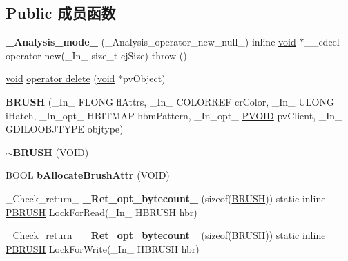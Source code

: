 \subsection*{Public 成员函数}
\begin{DoxyCompactItemize}
\item 
\mbox{\label{class_b_r_u_s_h_a4fdc57802164b268d120cd978dafd4b0}} 
{\bfseries \+\_\+\+Analysis\+\_\+mode\+\_\+} (\+\_\+\+Analysis\+\_\+operator\+\_\+new\+\_\+null\+\_\+) inline \hyperlink{interfacevoid}{void} $\ast$\+\_\+\+\_\+cdecl operator new(\+\_\+\+In\+\_\+ size\+\_\+t cj\+Size)  throw ()
\item 
\hyperlink{interfacevoid}{void} \hyperlink{class_b_r_u_s_h_a457266c039301ff0c938f1fee80544c1}{operator delete} (\hyperlink{interfacevoid}{void} $\ast$pv\+Object)
\item 
\mbox{\label{class_b_r_u_s_h_a52f0609ca54e8364f115e0d3fe4e4fb2}} 
{\bfseries B\+R\+U\+SH} (\+\_\+\+In\+\_\+ F\+L\+O\+NG fl\+Attrs, \+\_\+\+In\+\_\+ C\+O\+L\+O\+R\+R\+EF cr\+Color, \+\_\+\+In\+\_\+ U\+L\+O\+NG i\+Hatch, \+\_\+\+In\+\_\+opt\+\_\+ H\+B\+I\+T\+M\+AP hbm\+Pattern, \+\_\+\+In\+\_\+opt\+\_\+ \hyperlink{interfacevoid}{P\+V\+O\+ID} pv\+Client, \+\_\+\+In\+\_\+ G\+D\+I\+L\+O\+O\+B\+J\+T\+Y\+PE objtype)
\item 
\mbox{\label{class_b_r_u_s_h_aff34836a6b76089ef20c5e73a440f1ba}} 
{\bfseries $\sim$\+B\+R\+U\+SH} (\hyperlink{interfacevoid}{V\+O\+ID})
\item 
\mbox{\label{class_b_r_u_s_h_a78b133b08c2c94534fdc1435973a43ee}} 
B\+O\+OL {\bfseries b\+Allocate\+Brush\+Attr} (\hyperlink{interfacevoid}{V\+O\+ID})
\item 
\mbox{\label{class_b_r_u_s_h_a706d2a8c846ea1098261449e80bfecb5}} 
\+\_\+\+Check\+\_\+return\+\_\+ {\bfseries \+\_\+\+Ret\+\_\+opt\+\_\+bytecount\+\_\+} (sizeof(\hyperlink{class_b_r_u_s_h}{B\+R\+U\+SH})) static inline \hyperlink{struct___b_r_u_s_h}{P\+B\+R\+U\+SH} Lock\+For\+Read(\+\_\+\+In\+\_\+ H\+B\+R\+U\+SH hbr)
\item 
\mbox{\label{class_b_r_u_s_h_a00c7fb54f465e2a3a54745c41ffaa337}} 
\+\_\+\+Check\+\_\+return\+\_\+ {\bfseries \+\_\+\+Ret\+\_\+opt\+\_\+bytecount\+\_\+} (sizeof(\hyperlink{class_b_r_u_s_h}{B\+R\+U\+SH})) static inline \hyperlink{struct___b_r_u_s_h}{P\+B\+R\+U\+SH} Lock\+For\+Write(\+\_\+\+In\+\_\+ H\+B\+R\+U\+SH hbr)

\end{DoxyCompactItemize}
